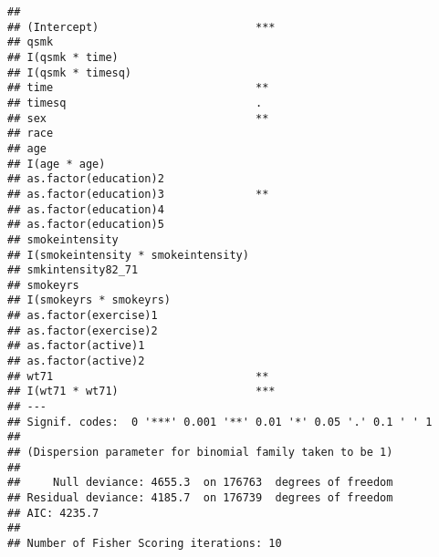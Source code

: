 \documentclass[10pt,]{book}
\newenvironment{Shaded}{\begin{snugshade}}{\end{snugshade}}
\newcommand{\CommentTok}[1]{\textcolor[rgb]{0.56,0.35,0.01}{\textit{#1}}}
\newcommand{\DataTypeTok}[1]{\textcolor[rgb]{0.13,0.29,0.53}{#1}}
\newcommand{\DecValTok}[1]{\textcolor[rgb]{0.00,0.00,0.81}{#1}}
\newcommand{\KeywordTok}[1]{\textcolor[rgb]{0.13,0.29,0.53}{\textbf{#1}}}
\newcommand{\NormalTok}[1]{#1}
\newcommand{\OperatorTok}[1]{\textcolor[rgb]{0.81,0.36,0.00}{\textbf{#1}}}
\newcommand{\StringTok}[1]{\textcolor[rgb]{0.31,0.60,0.02}{#1}}
\begin{document}
\begin{verbatim}
##                                       
## (Intercept)                        ***
## qsmk                                  
## I(qsmk * time)                        
## I(qsmk * timesq)                      
## time                               ** 
## timesq                             .  
## sex                                ** 
## race                                  
## age                                   
## I(age * age)                          
## as.factor(education)2                 
## as.factor(education)3              ** 
## as.factor(education)4                 
## as.factor(education)5                 
## smokeintensity                        
## I(smokeintensity * smokeintensity)    
## smkintensity82_71                     
## smokeyrs                              
## I(smokeyrs * smokeyrs)                
## as.factor(exercise)1                  
## as.factor(exercise)2                  
## as.factor(active)1                    
## as.factor(active)2                    
## wt71                               ** 
## I(wt71 * wt71)                     ***
## ---
## Signif. codes:  0 '***' 0.001 '**' 0.01 '*' 0.05 '.' 0.1 ' ' 1
## 
## (Dispersion parameter for binomial family taken to be 1)
## 
##     Null deviance: 4655.3  on 176763  degrees of freedom
## Residual deviance: 4185.7  on 176739  degrees of freedom
## AIC: 4235.7
## 
## Number of Fisher Scoring iterations: 10
\end{verbatim}

\begin{Shaded}
\end{Shaded}
\end{document}
